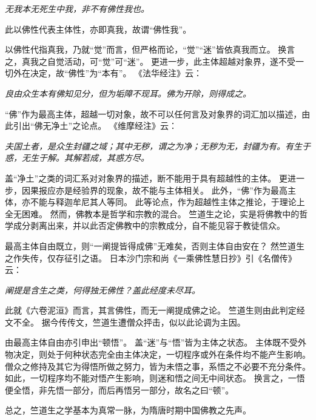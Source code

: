 \documentclass[11pt]{article}
\begin{document}
\textit{无我本无死生中我，非不有佛性我也。}

此以佛性代表主体性，亦即真我，故谓“佛性我”。

\newline

以佛性代指真我，乃就“觉”而言，但严格而论，“觉”“迷”皆依真我而立。
换言之，真我之自觉活动，可“觉”可“迷”。
更进一步，此主体超越对象界，遂不受一切外在决定，故“佛性”为“本有”。
《法华经注》云：

\textit{良由众生本有佛知见分，但为垢障不现耳。佛为开除，则得成之。}

\newline

“佛”作为最高主体，超越一切对象，故不可以任何言及对象界的词汇加以描述，由此引出“佛无净土”之论点。
《维摩经注》云：

\textit{夫国土者，是众生封疆之域；其中无秽，谓之为净；无秽为无，封疆为有。有生于惑，无生于解。其解若成，其惑方尽。}

盖“净土”之类的词汇系对对象界的描述，断不能用于具有超越性的主体。
更进一步，因果报应亦是经验界的现象，故不能与主体相关。
此外，“佛”作为最高主体，亦不能与释迦牟尼其人等同。
此等论点，作为超越性主体之推论，于理论上全无困难。
然而，佛教本是哲学和宗教的混合。
竺道生之论，实是将佛教中的哲学成分剥离出来，并以此否定佛教中的宗教成分，自不能见容于教徒信众。

\newline

最高主体自由既立，则“一阐提皆得成佛”无难矣，否则主体自由安在？
然竺道生之作失传，仅存征引之语。
日本沙门宗和尚《一乘佛性慧日抄》引《名僧传》云：

\textit{阐提是含生之类，何得独无佛性？盖此经度未尽耳。}

此就《六卷泥洹》而言，其言佛性，而无一阐提成佛之论。
竺道生则由此判定经文不全。
据今传传文，竺道生遭僧众抨击，似以此论调为主因。

\newline

由最高主体自由亦引申出“顿悟”。
盖“迷”与“悟”皆为主体之状态。
主体既不受外物决定，则处于何种状态完全由主体决定，一切程序或外在条件均不能产生影响。
僧众之修持及其它为得悟所做之努力，皆为未悟之事，系悟之不必要不充分条件。
如此，一切程序均不能对悟产生影响，则迷和悟之间无中间状态。
换言之，一悟便全悟，非先悟一部分，而后再悟另一部分，故名之曰“顿”。

\newline

总之，竺道生之学基本为真常一脉，为隋唐时期中国佛教之先声。
\end{document}
